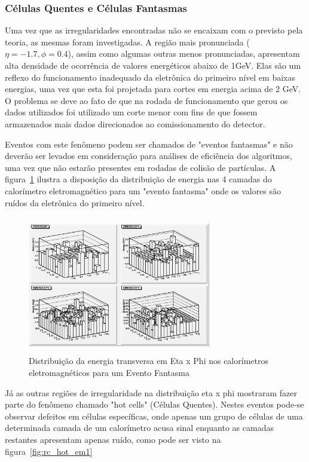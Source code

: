 \documentclass[a4paper,10pt,titlepage]{article}
\begin{document}
\subsubsection{Células Quentes e Células Fantasmas}

Uma vez que as irregularidades encontradas não se encaixam com o previsto pela teoria, as mesmas foram investigadas.
A região mais pronunciada ($\eta = -1.7, \phi = 0.4$), assim como algumas outras menos pronunciadas, apresentam alta densidade de ocorrência de valores energéticos abaixo de 1GeV.
Elas são um reflexo do funcionamento inadequado da eletrônica do primeiro nível em baixas energias, uma vez que esta foi projetada para cortes em energia acima de 2 GeV.
O problema se deve ao fato de que na rodada de funcionamento que gerou os dados utilizados foi utilizado um corte menor com fins de que fossem armazenados mais dados direcionados ao comissionamento do detector.

Eventos com este fenômeno podem ser chamados de "eventos fantasmas" e não deverão ser levados em consideração para análises de eficiência dos algoritmos, uma vez que não estarão presentes em rodadas de colisão de partículas.
A figura~\ref{fig:rc_low_et} ilustra a disposição da distribuição de energia nas 4 camadas do calorímetro eletromagnético para um "evento fantasma" onde os valores são ruídos da eletrônica do primeiro nível.

\begin{figure}[htbp!]
 \centering
 \includegraphics[width=8cm,height=6cm]{Figs/cosmics/rc_low_et.eps}
 \caption{Distribuição da energia transversa em Eta x Phi nos calorímetros eletromagnéticos para um Evento Fantasma}
 \label{fig:rc_low_et}
\end{figure}

Já as outras regiões de irregularidade na distribuição eta x phi mostraram fazer parte do fenômeno chamado "hot cells" (Células Quentes).
Nestes eventos pode-se observar defeitos em células específicas, onde apenas um grupo de células de uma determinada camada de um calorímetro acusa sinal enquanto as camadas restantes apresentam apenas ruído, como pode ser visto na figura~\ref{fig:rc_hot_em1}
\end{document}
